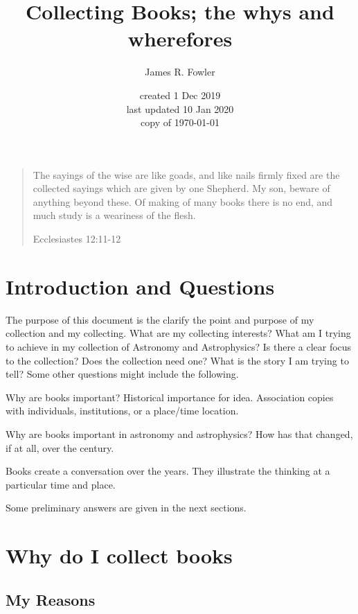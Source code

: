 \documentclass[letterpaper]{article}
\begin{document}
\title{Collecting Books; the whys and wherefores}
\author{James R. Fowler}
\date{created 1 Dec 2019\\ last updated 10 Jan 2020\\ copy of \today}

\maketitle

\begin{quotation}
  The sayings of the wise are like goads, and like nails firmly fixed
  are the collected sayings which are given by one Shepherd.  My son,
  beware of anything beyond these. Of making of many books there is no
  end, and much study is a weariness of the flesh.

  Ecclesiastes 12:11-12
\end{quotation}

\section{Introduction and Questions}

The purpose of this document is the clarify the point and purpose of
my collection and my collecting. What are my collecting interests?
What am I trying to achieve in my collection of  Astronomy and
Astrophysics? Is there a clear focus to the collection? Does the
collection need one? What is the story I am trying to tell? Some other
questions might include the following.

Why are books important? Historical importance for idea. Association
copies with individuals, institutions, or a place/time location.

Why are books important in  astronomy and astrophysics? How
has that changed, if at all, over the century.

Books create a conversation over the years. They illustrate the thinking
at a particular time and place.

Some preliminary answers are given in the next sections.

\section{Why do I collect books}

\subsection{My Reasons}
\end{document}
